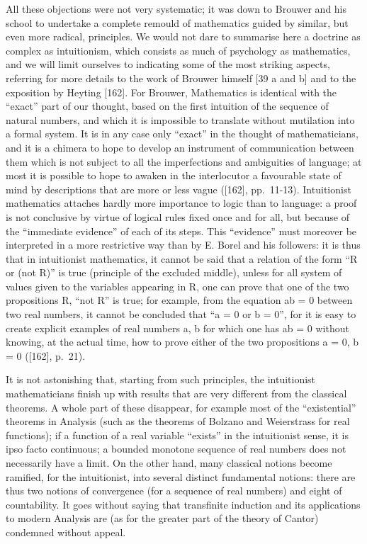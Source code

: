 All these objections were not very systematic; it was down to Brouwer and his school to undertake a complete remould of mathematics guided by similar, but even more radical, principles. We would not dare to summarise here a doctrine as complex as intuitionism, which consists as much of psychology as mathematics, and we will limit ourselves to indicating some of the most striking aspects, referring for more details to the work of Brouwer himself {[}39 a and b{]} and to the exposition by Heyting {[}162{]}. For Brouwer, Mathematics is identical with the ``exact'' part of our thought, based on the first intuition of the sequence of natural numbers, and which it is impossible to translate without mutilation into a formal system. It is in any case only ``exact'' in the thought of mathematicians, and it is a chimera to hope to develop an instrument of communication between them which is not subject to all the imperfections and ambiguities of language; at most it is possible to hope to awaken in the interlocutor a favourable state of mind by descriptions that are more or less vague ({[}162{]}, pp.~11-13). Intuitionist mathematics attaches hardly more importance to logic than to language: a proof is not conclusive by virtue of logical rules fixed once and for all, but because of the ``immediate evidence'' of each of its steps. This ``evidence'' must moreover be interpreted in a more restrictive way than by E. Borel and his followers: it is thus that in intuitionist mathematics, it cannot be said that a relation of the form ``R or (not R)'' is true (principle of the excluded middle), unless for all system of values given to the variables appearing in R, one can prove that one of the two propositions R, ``not R'' is true; for example, from the equation ab = 0 between two real numbers, it cannot be concluded that ``a = 0 or b = 0'', for it is easy to create explicit examples of real numbers a, b for which one has ab = 0 without knowing, at the actual time, how to prove either of the two propositions a = 0, b = 0 ({[}162{]}, p.~21).

It is not astonishing that, starting from such principles, the intuitionist mathematicians finish up with results that are very different from the classical theorems. A whole part of these disappear, for example most of the ``existential'' theorems in Analysis (such as the theorems of Bolzano and Weierstrass for real functions); if a function of a real variable ``exists'' in the intuitionist sense, it is ipso facto continuous; a bounded monotone sequence of real numbers does not necessarily have a limit. On the other hand, many classical notions become ramified, for the intuitionist, into several distinct fundamental notions: there are thus two notions of convergence (for a sequence of real numbers) and eight of countability. It goes without saying that transfinite induction and its applications to modern Analysis are (as for the greater part of the theory of Cantor) condemned without appeal.

